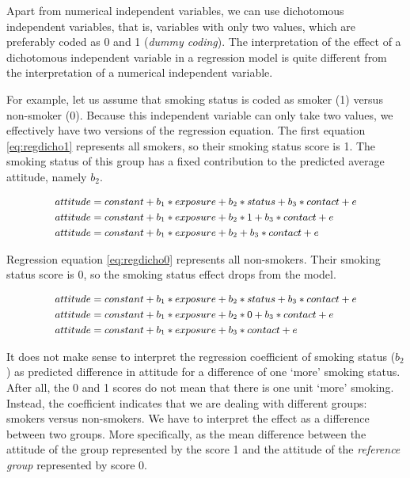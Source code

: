 \documentclass[a4paper]{book}
\theoremstyle{definition}
\theoremstyle{definition}
\theoremstyle{definition}
\theoremstyle{remark}
\begin{document}
Apart from numerical independent variables, we can use dichotomous
independent variables, that is, variables with only two values, which
are preferably coded as 0 and 1 (\emph{dummy coding}). The
interpretation of the effect of a dichotomous independent variable in a
regression model is quite different from the interpretation of a
numerical independent variable.

For example, let us assume that smoking status is coded as smoker (1)
versus non-smoker (0). Because this independent variable can only take
two values, we effectively have two versions of the regression equation.
The first equation \eqref{eq:regdicho1} represents all smokers, so their
smoking status score is 1. The smoking status of this group has a fixed
contribution to the predicted average attitude, namely \(b_2\).

\begin{equation}
\small
\begin{split}
  attitude &= constant + b_1*exposure + b_2*status + b_3*contact + e \\
  attitude &= constant + b_1*exposure + b_2*1 + b_3*contact + e \\
  attitude &= constant + b_1*exposure + b_2 + b_3*contact + e 
\end{split}
\label{eq:regdicho1} 
\normalsize
\end{equation}

Regression equation \eqref{eq:regdicho0} represents all non-smokers. Their
smoking status score is 0, so the smoking status effect drops from the
model.

\begin{equation}
\small
\begin{split}
  attitude &= constant + b_1*exposure + b_2*status + b_3*contact + e \\
  attitude &= constant + b_1*exposure + b_2*0 + b_3*contact + e \\
  attitude &= constant + b_1*exposure + b_3*contact + e 
\end{split}
  \label{eq:regdicho0} 
\normalsize
\end{equation}

It does not make sense to interpret the regression coefficient of
smoking status (\(b_2\)) as predicted difference in attitude for a
difference of one `more' smoking status. After all, the 0 and 1 scores
do not mean that there is one unit `more' smoking. Instead, the
coefficient indicates that we are dealing with different groups: smokers
versus non-smokers. We have to interpret the effect as a difference
between two groups. More specifically, as the mean difference between
the attitude of the group represented by the score 1 and the attitude of
the \emph{reference group} represented by score 0.
\end{document}
